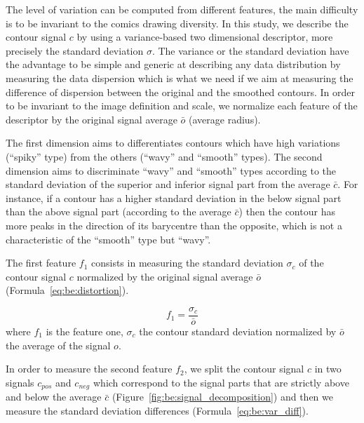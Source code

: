 The level of variation can be computed from different features, the main difficulty is to be invariant to the comics drawing diversity. 
In this study, we describe the contour signal $c$ by using a variance-based two dimensional descriptor, more precisely the standard deviation $\sigma$. The variance or the standard deviation have the advantage to be simple and generic at describing any data distribution by measuring the data dispersion which is what we need if we aim at measuring the difference of dispersion between the original and the smoothed contours. In order to be invariant to the image definition and scale, we normalize each feature of the descriptor by the original signal average $\bar{o}$ (average radius).

The first dimension aims to differentiates contours which have high variations (``spiky'' type) from the others (``wavy'' and ``smooth'' types). The second dimension aims to discriminate ``wavy'' and ``smooth'' types according to the standard deviation of the superior and inferior signal part from the average $\bar{c}$. For instance, if a contour has a higher standard deviation in the below signal part than the above signal part (according to the average $\bar{c}$) then the contour has more peaks in the direction of its barycentre than the opposite, which is not a characteristic of the ``smooth'' type but ``wavy''.

The first feature $f_1$ consists in measuring the standard deviation $\sigma_c$ of the contour signal $c$ normalized by the original signal average $\bar{o}$ (Formula~\ref{eq:be:distortion}).


\begin{equation}\label{eq:be:distortion}
 f_1 = \frac{\sigma_c}{\bar{o}}%
\end{equation}
where $f_1$ is the feature one, $\sigma_c$ the contour standard deviation normalized by $\bar{o}$ the average of the signal $o$. 


In order to measure the second feature $f_2$, we split the contour signal $c$ in two signals $c_{pos}$ and $c_{neg}$ which correspond to the signal parts that are strictly above and below the average $\bar{c}$ (Figure~\ref{fig:be:signal_decomposition}) and then we measure the standard deviation differences (Formula~\ref{eq:be:var_diff}).%


